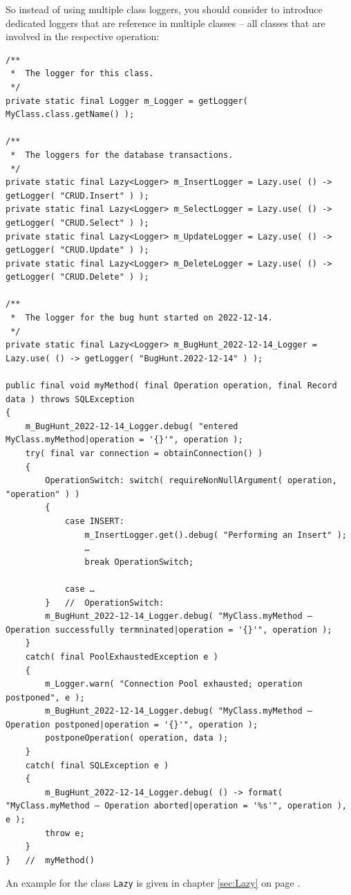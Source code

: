 \documentclass[11pt,a4paper, titlepage, parskip=half, headsepline, footsepline, cleardoublepage=current, headheight=1cm]{scrbook}
\newcommand*{\tqvref}[1]{\hyperref[{#1}]{\ref*{#1}} on page \pageref{#1}}
\begin{document}
So instead of using multiple class loggers, you should consider to introduce dedicated loggers that are reference in multiple classes – all classes that are involved in the respective operation:
\begin{lstlisting}
/**
 *  The logger for this class.
 */
private static final Logger m_Logger = getLogger( MyClass.class.getName() ); 

/**
 *  The loggers for the database transactions.
 */
private static final Lazy<Logger> m_InsertLogger = Lazy.use( () -> getLogger( "CRUD.Insert" ) );
private static final Lazy<Logger> m_SelectLogger = Lazy.use( () -> getLogger( "CRUD.Select" ) );
private static final Lazy<Logger> m_UpdateLogger = Lazy.use( () -> getLogger( "CRUD.Update" ) );
private static final Lazy<Logger> m_DeleteLogger = Lazy.use( () -> getLogger( "CRUD.Delete" ) );

/**
 *  The logger for the bug hunt started on 2022-12-14.
 */
private static final Lazy<Logger> m_BugHunt_2022-12-14_Logger = Lazy.use( () -> getLogger( "BugHunt.2022-12-14" ) );

public final void myMethod( final Operation operation, final Record data ) throws SQLException
{
    m_BugHunt_2022-12-14_Logger.debug( "entered MyClass.myMethod|operation = '{}'", operation );
    try( final var connection = obtainConnection() )
    {
        OperationSwitch: switch( requireNonNullArgument( operation, "operation" ) )
        {
            case INSERT:
                m_InsertLogger.get().debug( "Performing an Insert" );
                …
                break OperationSwitch;
                
            case …
        }   //  OperationSwitch:
        m_BugHunt_2022-12-14_Logger.debug( "MyClass.myMethod – Operation successfully termninated|operation = '{}'", operation );       
    }
    catch( final PoolExhaustedException e )
    {
        m_Logger.warn( "Connection Pool exhausted; operation postponed", e );
        m_BugHunt_2022-12-14_Logger.debug( "MyClass.myMethod – Operation postponed|operation = '{}'", operation );       
        postponeOperation( operation, data ); 
    }    
    catch( final SQLException e )
    {
        m_BugHunt_2022-12-14_Logger.debug( () -> format( "MyClass.myMethod – Operation aborted|operation = '%s'", operation ), e );
        throw e;
    }
}   //  myMethod() 
\end{lstlisting}

An example for the class \lstinline|Lazy| is given in chapter \tqvref{sec:Lazy}.
\end{document}
